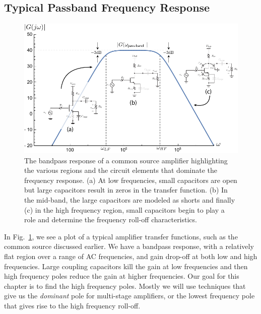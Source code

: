 \subsection{Typical Passband Frequency Response}

\begin{figure}[tb]
\begin{center}
\includegraphics[width=.95\columnwidth]{amp_bandpass_decorate} 
\end{center}
\caption{The bandpass response of a common source amplifier highlighting the various regions and the circuit elements that dominate the frequency response.  (a) At low frequencies, small capacitors are open but large capacitors result in zeros in the transfer function.  (b) In the mid-band, the large capacitors are modeled as shorts and finally (c) in the high frequency region, small capacitors begin to play a role and determine the frequency roll-off characteristics.} \label{fig:amp_bandpass}
\end{figure}

In Fig.~\ref{fig:amp_bandpass}, we see a plot of a typical amplifier transfer functions, such as the common source discussed earlier.  We have a bandpass response, with a relatively flat region over a range of AC frequencies, and gain drop-off at both low and high frequencies.  Large coupling capacitors kill the gain at low frequencies and then high frequency poles reduce the gain at higher frequencies. Our goal for this chapter is to find the high frequency poles.  Mostly we will use techniques that give us the \emph{dominant} pole for multi-stage amplifiers, or the lowest frequency pole that gives rise to the high frequency roll-off.


